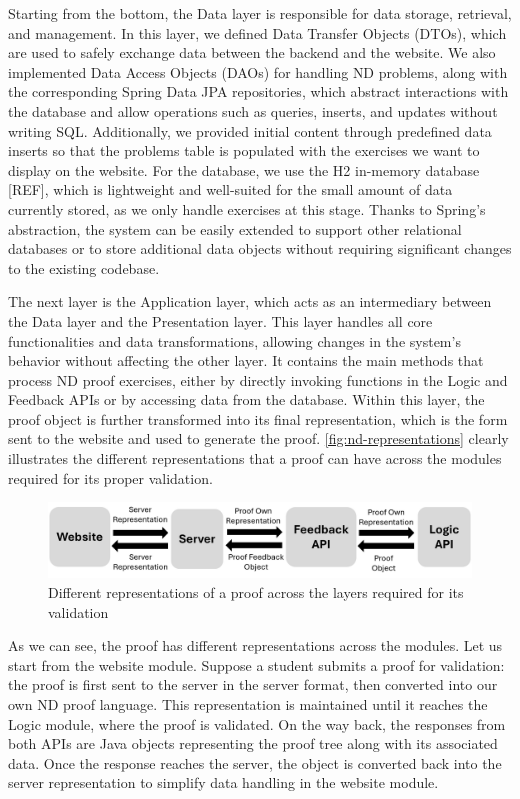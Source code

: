 Starting from the bottom, the Data layer is responsible for data storage, retrieval, and management. In this layer, we defined Data Transfer Objects (DTOs), which are used to safely exchange data between the backend and the website. We also implemented Data Access Objects (DAOs) for handling \gls{ND} problems, along with the corresponding Spring Data JPA repositories, which abstract interactions with the database and allow operations such as queries, inserts, and updates without writing SQL. Additionally, we provided initial content through predefined data inserts so that the problems table is populated with the exercises we want to display on the website. For the database, we use the H2 in-memory database [REF], which is lightweight and well-suited for the small amount of data currently stored, as we only handle exercises at this stage. Thanks to Spring’s abstraction, the system can be easily extended to support other relational databases or to store additional data objects without requiring significant changes to the existing codebase.

The next layer is the Application layer, which acts as an intermediary between the Data layer and the Presentation layer. This layer handles all core functionalities and data transformations, allowing changes in the system’s behavior without affecting the other layer. It contains the main methods that process \gls{ND} proof exercises, either by directly invoking functions in the Logic and Feedback APIs or by accessing data from the database. Within this layer, the proof object is further transformed into its final representation, which is the form sent to the website and used to generate the proof. \autoref{fig:nd-representations} clearly illustrates the different representations that a proof can have across the modules required for its proper validation.



\begin{figure}
    \centering
    \includegraphics[width=0.95\linewidth]{Chapters/Figures/nd-representations.png}
    \caption{Different representations of a proof across the layers required for its validation}
    \label{fig:nd-representations}
\end{figure}

As we can see, the proof has different representations across the modules. Let us start from the website module. Suppose a student submits a proof for validation: the proof is first sent to the server in the server format, then converted into our own \gls{ND} proof language. This representation is maintained until it reaches the Logic module, where the proof is validated. On the way back, the responses from both APIs are Java objects representing the proof tree along with its associated data. Once the response reaches the server, the object is converted back into the server representation to simplify data handling in the website module.

